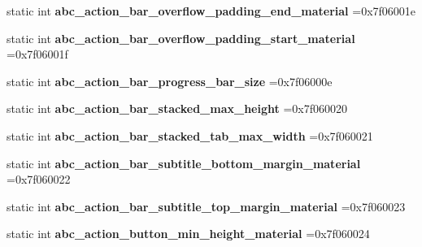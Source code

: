 \begin{DoxyCompactItemize}
static int {\bfseries abc\+\_\+action\+\_\+bar\+\_\+overflow\+\_\+padding\+\_\+end\+\_\+material} =0x7f06001e
\item 
\mbox{\label{classandroid_1_1support_1_1design_1_1R_1_1dimen_adc1b56c7c71a5648a6f8f6bec088054e}} 
static int {\bfseries abc\+\_\+action\+\_\+bar\+\_\+overflow\+\_\+padding\+\_\+start\+\_\+material} =0x7f06001f
\item 
\mbox{\label{classandroid_1_1support_1_1design_1_1R_1_1dimen_aa39f0dc52be458803e695a9bdd476ccf}} 
static int {\bfseries abc\+\_\+action\+\_\+bar\+\_\+progress\+\_\+bar\+\_\+size} =0x7f06000e
\item 
\mbox{\label{classandroid_1_1support_1_1design_1_1R_1_1dimen_abb068376efbfcbaa93a44361efda6149}} 
static int {\bfseries abc\+\_\+action\+\_\+bar\+\_\+stacked\+\_\+max\+\_\+height} =0x7f060020
\item 
\mbox{\label{classandroid_1_1support_1_1design_1_1R_1_1dimen_a30f6dd8a12e2603c56ef7b90742e6fc0}} 
static int {\bfseries abc\+\_\+action\+\_\+bar\+\_\+stacked\+\_\+tab\+\_\+max\+\_\+width} =0x7f060021
\item 
\mbox{\label{classandroid_1_1support_1_1design_1_1R_1_1dimen_a2431c9438efb6c94a39ba365fbcfa2a9}} 
static int {\bfseries abc\+\_\+action\+\_\+bar\+\_\+subtitle\+\_\+bottom\+\_\+margin\+\_\+material} =0x7f060022
\item 
\mbox{\label{classandroid_1_1support_1_1design_1_1R_1_1dimen_a65f4f4163c07d860116326209b913db3}} 
static int {\bfseries abc\+\_\+action\+\_\+bar\+\_\+subtitle\+\_\+top\+\_\+margin\+\_\+material} =0x7f060023
\item 
\mbox{\label{classandroid_1_1support_1_1design_1_1R_1_1dimen_aa5c009f1fc9c89d2dfe1801e28bf928e}} 
static int {\bfseries abc\+\_\+action\+\_\+button\+\_\+min\+\_\+height\+\_\+material} =0x7f060024
\item 
\mbox{\label{classandroid_1_1support_1_1design_1_1R_1_1dimen_ab339a6a6a8e43f0e372d58dd3ed8d445}} 

\end{DoxyCompactItemize}
